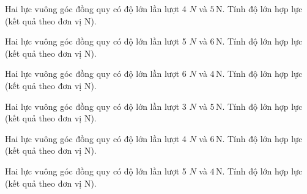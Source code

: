 \begin{ex}
Hai lực vuông góc đồng quy có độ lớn lần lượt 4 $N$ và $5\,\text{N}$. Tính độ lớn hợp lực (kết quả theo đơn vị N).
\end{ex}

\begin{ex}
Hai lực vuông góc đồng quy có độ lớn lần lượt 5 $N$ và $6\,\text{N}$. Tính độ lớn hợp lực (kết quả theo đơn vị N).
\end{ex}

\begin{ex}
Hai lực vuông góc đồng quy có độ lớn lần lượt 6 $N$ và $4\,\text{N}$. Tính độ lớn hợp lực (kết quả theo đơn vị N).
\end{ex}

\begin{ex}
Hai lực vuông góc đồng quy có độ lớn lần lượt 3 $N$ và $5\,\text{N}$. Tính độ lớn hợp lực (kết quả theo đơn vị N).
\end{ex}

\begin{ex}
Hai lực vuông góc đồng quy có độ lớn lần lượt 4 $N$ và $6\,\text{N}$. Tính độ lớn hợp lực (kết quả theo đơn vị N).
\end{ex}

\begin{bt}
Hai lực vuông góc đồng quy có độ lớn lần lượt 5 $N$ và $4\,\text{N}$. Tính độ lớn hợp lực (kết quả theo đơn vị N).
\end{bt}

